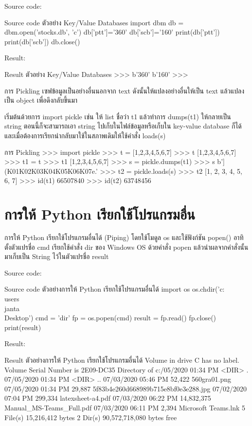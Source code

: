 Source code:
\begin{codelist}{Source code ตัวอย่าง Key/Value Databases}{}
import dbm
db = dbm.open('stocks.db', 'c')
db['ptt']='360'
db['scb']='160'
print(db['ptt'])
print(db['scb'])
db.close()
\end{codelist}

Result:
\begin{codelist}{Result ตัวอย่าง Key/Value Databases}{}
>>>
b'360'
b'160'
>>>
\end{codelist}


การ Pickling เซฟข้อมูลเป็นอย่างอื่นนอกจาก text ดังนั้นให้แปลงอย่างอื่นให้เป็น text แล้วแปลงเป็น object เพื่อดึงกลับขึ้นมา

เริ่มต้นด้วยการ import pickle เช่น ให้ list ชื่อว่า t1 แล้วทำการ dumps(t1) ให้กลายเป็น string ตอนนี้ก็จะสามารถเอา string ไปเก็บในไฟล์ข้อมูลหรือเก็บใน key-value database ก็ได้ และเมื่อต้องการเรียกนำกลับมาใช้ในสภาพเดิมให้ใช้คำสั่ง loads(s) 

\begin{codelist}{การ Pickling}{}
>>> import pickle
>>> t = [1,2,3,4,5,6,7]
>>> t
[1,2,3,4,5,6,7]
>>> t1 = t
>>> t1
[1,2,3,4,5,6,7]
>>> s = pickle.dumps(t1)
>>> s
 b'](K\x01K\x02K\x03K\x04K\x05K\x06K\x07e.'
>>> t2 = pickle.loads(s)
>>> t2
[1, 2, 3, 4, 5, 6, 7]
>>> id(t1)
66507840
>>> id(t2)
63748456
\end{codelist}



\section{การให้ Python เรียกใช้โปรแกรมอื่น}

การให้ Python เรียกใช้โปรแกรมอื่นได้ (Piping) โดยใช้โมดูล os และใช้ฟังก์ชัน popen()  อาทิ ตั้งตัวแปรชื่อ cmd เรียกใช้คำสั่ง dir ของ Windows OS ด้วยคำสั่ง popen แล้วนำผลจากคำสั่งนั้นมาเก็บเป็น String ไว้ในตัวแปรชื่อ result 

Source code:
\begin{codelist}{Source code ตัวอย่างการให้ Python เรียกใช้โปรแกรมอื่นได้}{}
import os
os.chdir('c:\\users\\janta\\Desktop')
cmd = 'dir'
fp = os.popen(cmd)
result = fp.read()
fp.close()
print(result)

\end{codelist}

Result:
\begin{codelist}{Result ตัวอย่างการให้ Python เรียกใช้โปรแกรมอื่นได้}{}
Volume in drive C has no label.
Volume Serial Number is 2E09-DC35
Directory of c:\users\janta{}/05/2020  01:34 PM    <DIR>          .
07/05/2020  01:34 PM    <DIR>          ..
07/03/2020  05:46 PM            52,422 560gra01.png
07/05/2020  01:34 PM            29,887 5f83b4e260d668989b715e8bf0e3e288.jpg
07/02/2020  07:04 PM           299,334 latexsheet-a4.pdf
07/03/2020  06:22 PM        14,832,375 Manual_MS-Teams_Full.pdf
07/03/2020  06:11 PM             2,394 Microsoft Teams.lnk
               5 File(s)     15,216,412 bytes
               2 Dir(s)  90,572,718,080 bytes free
\end{codelist}



